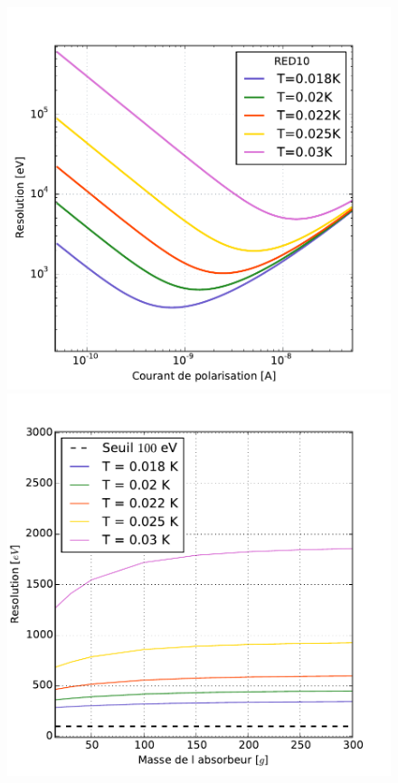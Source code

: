 \begin{figure}[!ht]
\begin{minipage}{0.49\textwidth}
\includegraphics[width=\textwidth]{Images/red10_i.pdf}
\end{minipage}
\hfill
\begin{minipage}{0.49\textwidth}
\includegraphics[width=\textwidth]{Images/red10_mass.pdf}

\end{minipage}
\end{figure}

